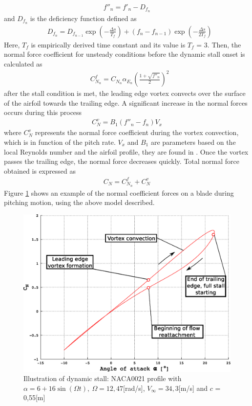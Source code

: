 \documentclass[a4paper]{jpconf}
\begin{document}
\begin{align}
f''_n = f'_n - D _{f_n}	   \label{dyndelay}
\end{align}
and $D_{f_n}$ is the deficiency function defined as
\begin{align}
& D_{f_n} = D_{f_{n-1}} \exp \left( - \frac{\Delta s}{T_f} \right) + (f_n - f_{n-1})\exp \left( - \frac{\Delta s}{2T_f} \right) \label{deff}
\end{align}
Here, $T_f$ is empirically derived time constant and its value is $T_f$ = 3. Then, the normal force coefficient for unsteady conditions before the dynamic stall onset is calculated as
\begin{align}
& C_{N_n}^f = C_{N_\alpha} \alpha_{E_n} \left( \frac{1 + \sqrt{f''_n}}{2} \right)^2	\label{CNf}
\end{align}
after the stall condition is met, the leading edge vortex convects over the surface of the airfoil towards the trailing edge. A significant increase in the normal forces occurs during this process
\begin{align}
C_N^v = B_1 (f''_n - f_n) V_x \label{CNv}
\end{align}
where $C_N^v$ represents the normal force coefficient during the vortex convection, which is in function of the pitch rate. $V_x$ and $B_1$ are parameters based on the local Reynolds number and the airfoil profile, they are found in \cite{dyachuk2013dynamic}. Once the vortex passes the trailing edge, the normal force decreases quickly. Total normal force obtained is expressed as
\begin{align}
C_N = C_{N_n}^f + C_N^v \label{CNtotal}
\end{align}
Figure \ref{figpitching} shows an example of the normal coefficient forces on a blade during pitching motion, using the above model described.

\begin{figure}[h]
\begin{center}
\includegraphics[width=0.5\columnwidth]{CNpitching2.eps}
\end{center}
\caption{\label{figpitching} Illustration of dynamic stall: NACA0021 profile with $\alpha=6 + 16 \sin (\Omega	t), \ \Omega=12,47$[rad/s], $V_\infty=34,3$[m/s] and $c$ = 0,55[m]}
\end{figure}
\end{document}

